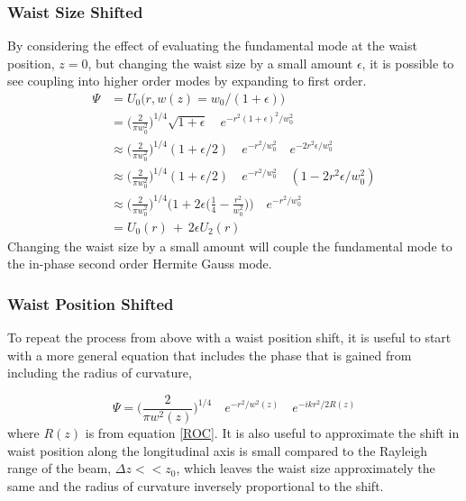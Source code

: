 \documentclass[oneside]{book}
\begin{document}
		\subsubsection{Waist Size Shifted}
		By considering the effect of evaluating the fundamental mode at the waist position, $z=0$, but changing the waist size by a small amount $\epsilon$, it is possible to see coupling into higher order modes by expanding to first order.	
		\begin{equation}
		\begin{aligned}
		\Psi 	&=  		U_{0} \big(r,w(z) = w_0/(1+\epsilon) \big) 
		\\		&= 			\bigg( \frac{2}{\pi w_0^2} \bigg)^{1/4} \sqrt{1 + \epsilon} \quad e^{-r^2 (1+\epsilon)^2/w_0^2 }
		\\		&\approx 	\bigg( \frac{2}{\pi w_0^2} \bigg)^{1/4} (1 + \epsilon /2) \quad e^{-r^2/w_0^2} \quad e^{-2r^2\epsilon/w_0^2} 
		\\		&\approx 	\bigg( \frac{2}{\pi w_0^2} \bigg)^{1/4} (1 + \epsilon /2) \quad e^{-r^2/w_0^2} \quad (1-2r^2\epsilon/w_0^2)
		\\		&\approx 	\bigg( \frac{2}{\pi w_0^2} \bigg)^{1/4} \bigg(1+ 2\epsilon\bigg(\frac{1}{4} - \frac{r^2}{w_0^2}\bigg) \bigg ) \quad e^{-r^2/w_0^2}	
		\\		&=			U_0(r) \, + \, 2\epsilon U_2(r)
		\end{aligned}
		\end{equation}
		Changing the waist size by a small amount will couple the fundamental mode to the in-phase second order Hermite Gauss mode.
		
		\subsubsection{Waist Position Shifted}
		To repeat the process from above with a waist position shift, it is useful to start with a more general equation that includes the phase that is gained from including the radius of curvature,
		
		\begin{equation}\label{EFieldwPhase}
		\Psi = 	\bigg( \frac{2}{\pi w^2(z)} \bigg)^{1/4} \quad e^{-r^2/w^2(z)} \quad e^{-ikr^2/2R(z)}
		\end{equation}
		where $R(z)$ is from equation \ref{ROC}.  It is also useful to approximate the shift in waist position along the longitudinal axis is small compared to the Rayleigh range of the beam, $\Delta z << z_0$, which leaves the waist size approximately the same and the radius of curvature inversely proportional to the shift. 
		
\end{document}
